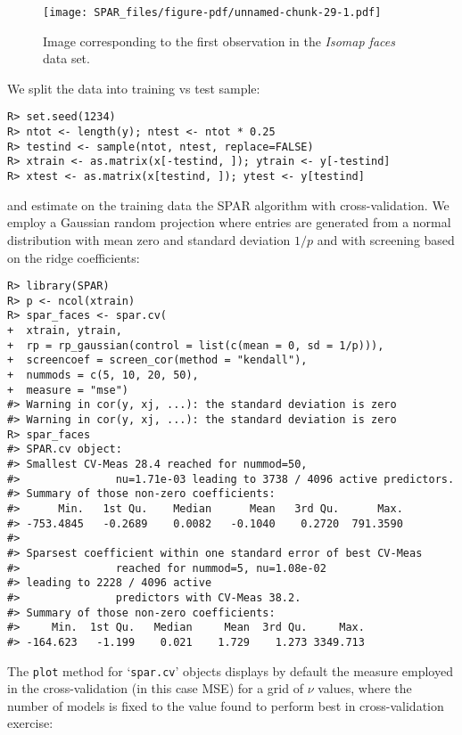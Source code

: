 \documentclass[
  article]{jss}
\begin{document}
\begin{figure}[H]

{\centering \texttt{[image: SPAR\_files/figure-pdf/unnamed-chunk-29-1.pdf]}

}

\caption{Image corresponding to the first observation in the
\emph{Isomap faces} data set. \label{fig:facesplot_i1}}

\end{figure}%

We split the data into training vs test sample:

\begin{verbatim}
R> set.seed(1234)
R> ntot <- length(y); ntest <- ntot * 0.25
R> testind <- sample(ntot, ntest, replace=FALSE)
R> xtrain <- as.matrix(x[-testind, ]); ytrain <- y[-testind]
R> xtest <- as.matrix(x[testind, ]); ytest <- y[testind]
\end{verbatim}

and estimate on the training data the SPAR algorithm with
cross-validation. We employ a Gaussian random projection where entries
are generated from a normal distribution with mean zero and standard
deviation \(1/p\) and with screening based on the ridge coefficients:

\begin{verbatim}
R> library(SPAR)
R> p <- ncol(xtrain)
R> spar_faces <- spar.cv(
+  xtrain, ytrain,
+  rp = rp_gaussian(control = list(c(mean = 0, sd = 1/p))),
+  screencoef = screen_cor(method = "kendall"),
+  nummods = c(5, 10, 20, 50),
+  measure = "mse")
#> Warning in cor(y, xj, ...): the standard deviation is zero
#> Warning in cor(y, xj, ...): the standard deviation is zero
R> spar_faces
#> SPAR.cv object:
#> Smallest CV-Meas 28.4 reached for nummod=50,
#>               nu=1.71e-03 leading to 3738 / 4096 active predictors.
#> Summary of those non-zero coefficients:
#>      Min.   1st Qu.    Median      Mean   3rd Qu.      Max. 
#> -753.4845   -0.2689    0.0082   -0.1040    0.2720  791.3590 
#> 
#> Sparsest coefficient within one standard error of best CV-Meas
#>               reached for nummod=5, nu=1.08e-02 
#> leading to 2228 / 4096 active
#>               predictors with CV-Meas 38.2.
#> Summary of those non-zero coefficients:
#>     Min.  1st Qu.   Median     Mean  3rd Qu.     Max. 
#> -164.623   -1.199    0.021    1.729    1.273 3349.713
\end{verbatim}

The \texttt{plot} method for `\texttt{spar.cv}' objects displays by
default the measure employed in the cross-validation (in this case MSE)
for a grid of \(\nu\) values, where the number of models is fixed to the
value found to perform best in cross-validation exercise:
\end{document}
